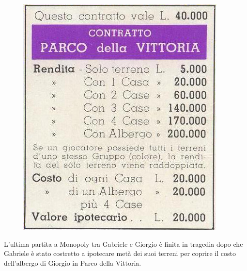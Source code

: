 
\makeatletter
\gdef\this@inputfilename{input.txt}
\gdef\this@outputfilename{output.txt}
\makeatother

\newcommand{\inputfile}{\texttt{input.txt}}
\newcommand{\outputfile}{\texttt{output.txt}}

\newenvironment{warning}
  {\par\begin{mdframed}[linewidth=2pt,linecolor=gray]%
    \begin{list}{}{\leftmargin=1cm
                   \labelwidth=\leftmargin}\item[\Large\ding{43}]}
  {\end{list}\end{mdframed}\par}

\begin{figure}
	\vspace{-1cm}
	\centering\includegraphics[width=.95\linewidth]{parco-vittoria.jpg}
	\vspace{-.5cm}
\end{figure}
L'ultima partita a Monopoly tra Gabriele e Giorgio è finita in tragedia dopo che Gabriele è stato costretto a ipotecare metà dei suoi terreni per coprire il costo dell'albergo di Giorgio in Parco della Vittoria.


